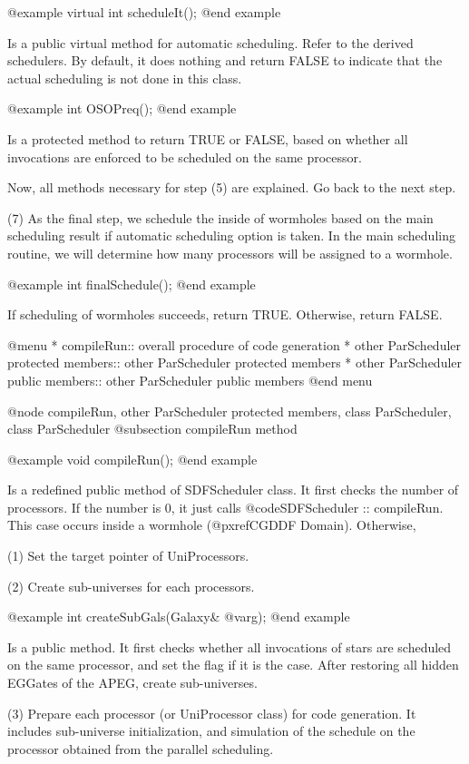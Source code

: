 @example
virtual int scheduleIt();
@end example

Is a public virtual method for automatic scheduling. Refer to the derived
schedulers. By default, it does nothing and return FALSE to indicate that
the actual scheduling is not done in this class.

@example
int OSOPreq();
@end example

Is a protected method to return TRUE or FALSE, based on whether all
invocations are enforced to be scheduled on the same processor.

Now, all methods necessary for step (5) are explained. Go back to the next
step.

(7) As the final step, we schedule the inside of wormholes based on the
main scheduling result if automatic scheduling option is taken. 
In the main scheduling routine, we will determine
how many processors will be assigned to a wormhole.

@example
int finalSchedule();
@end example

If scheduling of wormholes succeeds, return TRUE. Otherwise, return FALSE.

@menu
* compileRun::				  overall procedure of code generation
* other ParScheduler protected members::  other ParScheduler protected members
* other ParScheduler public members::	  other ParScheduler public members
@end menu

@node compileRun, other ParScheduler protected members, class ParScheduler, class ParScheduler
@subsection compileRun method

@example
void compileRun();
@end example

Is a redefined public method of SDFScheduler class. It first checks the number
of processors. 
If the number is 0, it just calls @code{SDFScheduler :: compileRun}. This
case occurs inside a wormhole (@pxref{CGDDF Domain}). Otherwise, 

(1) Set the target pointer of UniProcessors.

(2) Create sub-universes for each processors.

@example
int createSubGals(Galaxy& @var{g});
@end example

Is a public method. It first checks whether all invocations of stars are
scheduled on the same processor, and set the flag if it is the case.
After restoring all hidden EGGates of the APEG, create sub-universes.

(3) Prepare each processor (or UniProcessor class) for code generation.
It includes sub-universe initialization, and simulation of the schedule on
the processor obtained from the parallel scheduling.

